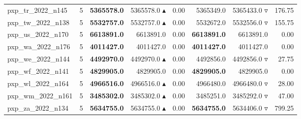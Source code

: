 \begin{table}[]
{\begin{tabular}{ll@{\hspace{1.2cm}}rrr@{\hspace{1.2cm}}rrr}
pxp_tr_2022_n145 & 5 & \textbf{5365578.0} & 5365578.0 $\blacktriangle$ & 0.00 & 5365349.0 & 5365433.0 $\triangledown$ & 176.75 \\
pxp_tw_2022_n138 & 5 & \textbf{5532757.0} & 5532757.0 $\blacktriangle$ & 0.00 & 5532672.0 & 5532556.0 $\triangledown$ & 155.75 \\
pxp_us_2022_n170 & 5 & \textbf{6613891.0} & 6613891.0 \phantom{$\blacktriangle$} & 0.00 & \textbf{6613891.0} & 6613891.0 \phantom{$\blacktriangle$} & 0.00 \\
pxp_wa_2022_n176 & 5 & \textbf{4011427.0} & 4011427.0 \phantom{$\blacktriangle$} & 0.00 & \textbf{4011427.0} & 4011427.0 \phantom{$\blacktriangle$} & 0.00 \\
pxp_we_2022_n144 & 5 & \textbf{4492970.0} & 4492970.0 $\blacktriangle$ & 0.00 & 4492856.0 & 4492856.0 $\triangledown$ & 27.75 \\
pxp_wf_2022_n141 & 5 & \textbf{4829905.0} & 4829905.0 \phantom{$\blacktriangle$} & 0.00 & \textbf{4829905.0} & 4829905.0 \phantom{$\blacktriangle$} & 0.00 \\
pxp_wl_2022_n164 & 5 & \textbf{4966516.0} & 4966516.0 $\blacktriangle$ & 0.00 & 4966480.0 & 4966480.0 $\triangledown$ & 28.00 \\
pxp_wm_2022_n161 & 5 & \textbf{3485302.0} & 3485302.0 $\blacktriangle$ & 0.00 & 3485251.0 & 3485292.0 $\triangledown$ & 47.00 \\
pxp_za_2022_n134 & 5 & \textbf{5634755.0} & 5634755.0 $\blacktriangle$ & 0.00 & \textbf{5634755.0} & 5634406.0 $\triangledown$ & 799.25 \\
\bottomrule
    \end{tabular}
    }
\end{table}
